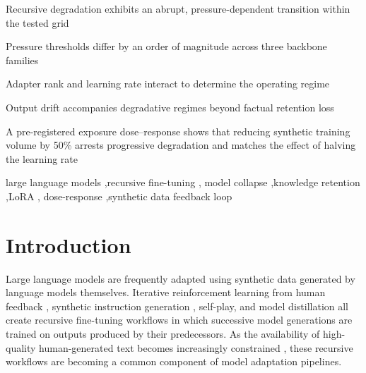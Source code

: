 \documentclass[a4paper,fleqn]{cas-dc}
\newif\ifshowchanges
\newcommand{\rev}[1]{\ifshowchanges{\color{blue}#1}\else{#1}\fi}
\begin{document}
\begin{highlights}
\item \rev{Recursive degradation exhibits an abrupt, pressure-dependent transition within the tested grid}
\item Pressure thresholds differ by an order of magnitude across three backbone families
\item Adapter rank and learning rate interact to determine the operating regime
\item Output drift accompanies degradative regimes beyond factual retention loss
\item \rev{A pre-registered exposure dose--response shows that reducing synthetic training volume by 50\% arrests progressive degradation and matches the effect of halving the learning rate}
\end{highlights}

\begin{keywords}
large language models \sep recursive fine-tuning \sep
model collapse \sep knowledge retention \sep LoRA \sep
dose-response \sep synthetic data feedback loop
\end{keywords}

\maketitle

\section{Introduction}\label{sec:introduction}

Large language models are frequently adapted using synthetic data generated by
language models themselves. Iterative reinforcement learning from human feedback
\citep{ouyang2022training}, synthetic instruction generation
\citep{wang2023selfinstruct,taori2023alpaca}, self-play, and model distillation
all create recursive fine-tuning workflows in which successive model generations
are trained on outputs produced by their predecessors. As the availability of high-quality
human-generated text becomes increasingly constrained \citep{villalobos2024},
these recursive workflows are becoming a common component of model adaptation
pipelines.
\end{document}
